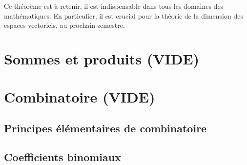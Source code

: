 Ce théorème est à retenir, il est indispensable dans tous les domaines des mathématiques. En particulier, il est crucial pour la théorie de la dimension des espaces vectoriels, au prochain semestre.

\section{Sommes et produits (VIDE)}



\section{Combinatoire (VIDE)}
\subsection{Principes élémentaires de combinatoire}
\subsection{Coefficients binomiaux}
